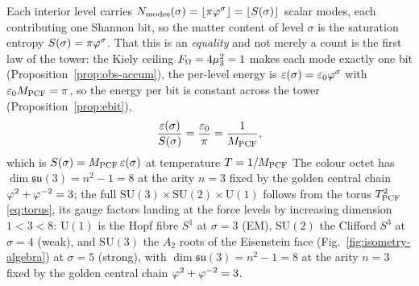 \begin{proposition}\label{prop:obs-matter}
Each interior level carries $N_{\mathrm{modes}}(\sigma)=\lfloor\pi\varphi^{\sigma}\rfloor
=\lfloor S(\sigma)\rfloor$ scalar modes, each contributing one Shannon bit, so the
matter content of level $\sigma$ is the saturation entropy $S(\sigma)=\pi\varphi^{\sigma}$. That
this is an \emph{equality} and not merely a count is the first law of the tower: the Kiely ceiling
$F_\Omega=4\mu_{3}^{2}=1$ makes each mode exactly one bit (Proposition~\ref{prop:obs-accum}), the
per-level energy is $\varepsilon(\sigma)=\varepsilon_{0}\varphi^{\sigma}$ with $\varepsilon_{0}M_{\mathrm{PCF}}=\pi$, so the energy
per bit is constant across the tower (Proposition~\ref{prop:ebit}),
\begin{equation}
  \frac{\varepsilon(\sigma)}{S(\sigma)}=\frac{\varepsilon_{0}}{\pi}=\frac1{M_{\mathrm{PCF}}},
\end{equation}
which is $S(\sigma)=M_{\mathrm{PCF}}\,\varepsilon(\sigma)$ at temperature $T=1/M_{\mathrm{PCF}}$
The colour octet has $\dim\mathfrak{su}(3)=n^{2}-1=8$ at the arity
$n=3$ fixed by the golden central chain $\varphi^{2}+\varphi^{-2}=3$; the full
$\mathrm{SU}(3)\times\mathrm{SU}(2)\times\mathrm{U}(1)$ follows from the torus $T^2_{\mathrm{PCF}}$
\eqref{eq:torus}, its gauge factors landing at the force levels by increasing dimension
$1<3<8$: $\mathrm{U}(1)$ is the Hopf fibre $S^1$ at $\sigma=3$ (EM), $\mathrm{SU}(2)$ the Clifford
$S^3$ at $\sigma=4$ (weak), and $\mathrm{SU}(3)$ the $A_2$ roots of the Eisenstein face
(Fig.~\ref{fig:isometry-algebra}) at $\sigma=5$ (strong), with $\dim\mathfrak{su}(3)=n^{2}-1=8$ at
the arity $n=3$ fixed by the golden central chain $\varphi^{2}+\varphi^{-2}=3$.



\end{proposition}
